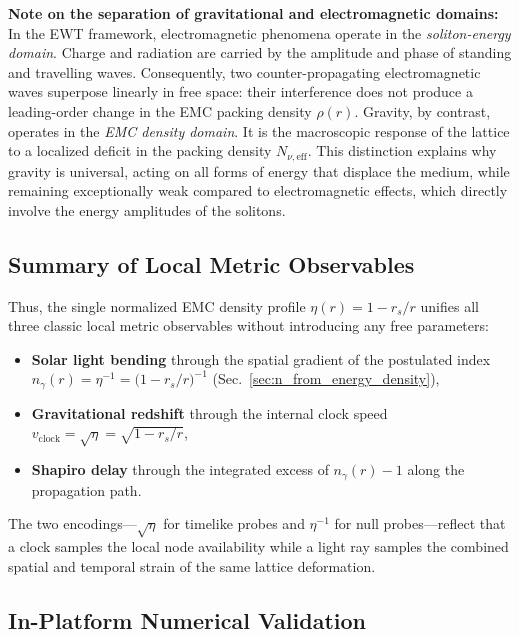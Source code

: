 \documentclass[10pt,a4paper]{article}
\begin{document}
\noindent

\textbf{Note on the separation of gravitational and electromagnetic domains:}
In the EWT framework, electromagnetic phenomena operate in the
\emph{soliton-energy domain}. Charge and radiation are carried by the
amplitude and phase of standing and travelling waves. Consequently, two
counter-propagating electromagnetic waves superpose linearly in free
space: their interference does not produce a leading-order change in
the EMC packing density \(\rho(r)\). Gravity, by contrast, operates in
the \emph{EMC density domain}. It is the macroscopic response of the
lattice to a localized deficit in the packing density
\(N_{\nu,\text{eff}}\). This distinction explains why gravity is
universal, acting on all forms of energy that displace the medium,
while remaining exceptionally weak compared to electromagnetic effects,
which directly involve the energy amplitudes of the solitons.

\subsection{Summary of Local Metric Observables}
Thus, the single normalized EMC density profile
\(\eta(r)=1-r_s/r\) unifies all three classic local metric observables without introducing any free parameters:

\begin{itemize}
	\item \textbf{Solar light bending} through the spatial gradient of the postulated index \(n_\gamma(r)=\eta^{-1}=\bigl(1-r_s/r\bigr)^{-1}\) (Sec.~\ref{sec:n_from_energy_density}),
	\item \textbf{Gravitational redshift} through the internal clock speed \(v_{\text{clock}}=\sqrt{\eta}=\sqrt{1-r_s/r}\),
	\item \textbf{Shapiro delay} through the integrated excess of \(n_\gamma(r)-1\) along the propagation path.
\end{itemize}

The two encodings---\(\sqrt{\eta}\) for timelike probes and \(\eta^{-1}\) for null probes---reflect that a clock samples the local node availability while a light ray samples the combined spatial and temporal strain of the same lattice deformation.

\subsection{In-Platform Numerical Validation}
\label{sec:local_metric_validation}
\end{document}
